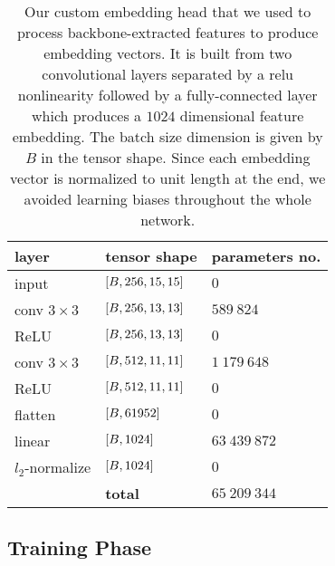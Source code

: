 \begin{table}[!t]
    \centering
    \begin{tabular}{lll}
        \toprule
        \textbf{layer}    & \textbf{tensor shape}        & \textbf{parameters no.} \\
        \midrule
        input             & $\left[ {B, 256, 15, 15} \right]$ & $0$                     \\
        \midrule
        conv $3 \times 3$ & $\left[ {B, 256, 13, 13} \right]$ & $589\ 824$              \\
        ReLU              & $\left[ {B, 256, 13, 13} \right]$ & $0$                     \\
        \midrule
        conv $3 \times 3$ & $\left[ {B, 512, 11, 11} \right]$ & $1\ 179\ 648$           \\
        ReLU              & $\left[ {B, 512, 11, 11} \right]$ & $0$                     \\
        \midrule
        flatten           & $\left[ {B, 61952} \right]$       & $0$                     \\
        linear            & $\left[ {B, 1024} \right]$        & $63\ 439\ 872$          \\
        \midrule
        $l_2$-normalize   & $\left[ {B, 1024} \right]$        & $0$                     \\
        \bottomrule
                          & \textbf{total}               & $65\ 209\ 344$          \\
        \cline{2-3}
    \end{tabular}
    \caption[Feature embedding head]{Our custom embedding head that we used to process backbone-extracted features to produce embedding vectors. It is built from two convolutional layers separated by a \gls{relu} nonlinearity followed by a fully-connected layer which produces a $1024$ dimensional feature embedding. The batch size dimension is given by $B$ in the tensor shape. Since each embedding vector is normalized to unit length at the end, we avoided learning biases throughout the whole network.}
    \label{tab:FeatureEmbeddingHead}
\end{table}

\subsection{Training Phase}

